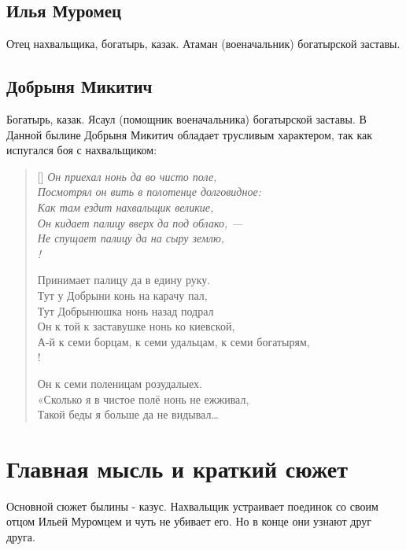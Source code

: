 \documentclass[a4paper, 12pt]{article}
\begin{document}
\subsection{Илья Муромец}
Отец нахвальщика, богатырь, казак. Атаман (военачальник) богатырской заставы.
\subsection{Добрыня Микитич}
Богатырь, казак. Ясаул (помощник военачальника) богатырской заставы. В Данной былине Добрыня Микитич обладает трусливым характером, так как испугался боя с нахвальщиком:
\settowidth{\versewidth}{А-й к семи борцам, к семи удальцам, к се}
\begin{verse}[\versewidth]
\itshape
Он приехал нонь да во чисто поле,\\
Посмотрял он вить в полотенце долговидное:\\
Как там ездит нахвальщик великие,\\
Он кидает палицу вверх да под облако, —\\
Не спущает палицу да на сыру землю,\\!

Принимает палицу да в едину руку.\\
Тут у Добрыни конь на карачу пал,\\
Тут Добрынюшка нонь назад подрал\\
Он к той к заставушке нонь ко киевской,\\
А-й к семи борцам, к семи удальцам, к семи богатырям,\\!

Он к семи поленицам розудалыех.\\
«Сколько я в чистое полё нонь не ежживал,\\
Такой беды я больше да не видывал\ldots\\
\end{verse}


\section{Главная мысль и краткий сюжет}
Основной сюжет былины - казус. Нахвальщик устраивает поединок со своим отцом Ильей Муромцем и чуть не убивает его. Но в конце они узнают друг друга.
\end{document}
